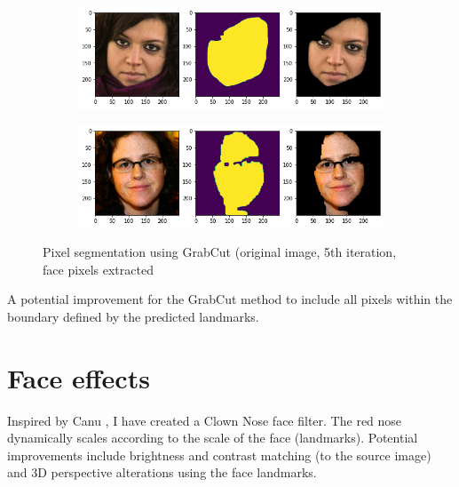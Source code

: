 \documentclass{article}
\begin{document}
\begin{figure}[h]
  \centering
  \begin{subfigure}[b]{.75\textwidth}
    \includegraphics[width=\textwidth]{seg1}
  \end{subfigure}
  \hfill
  \begin{subfigure}[b]{0.75\textwidth}
    \includegraphics[width=\textwidth]{seg5}
  \end{subfigure}
  \hfill
  \caption{Pixel segmentation using GrabCut (original image, 5th iteration, face pixels extracted}
  \label{fig:sig}
\end{figure}

A potential improvement for the GrabCut method to include all pixels within the boundary defined by the predicted landmarks.

\section{Face effects}

Inspired by Canu \cite{canu_2019}, I have created a Clown Nose face filter. The red nose dynamically scales according to the scale of the face (landmarks). Potential improvements include brightness and contrast matching (to the source image) and 3D perspective alterations using the face landmarks.
\end{document}
